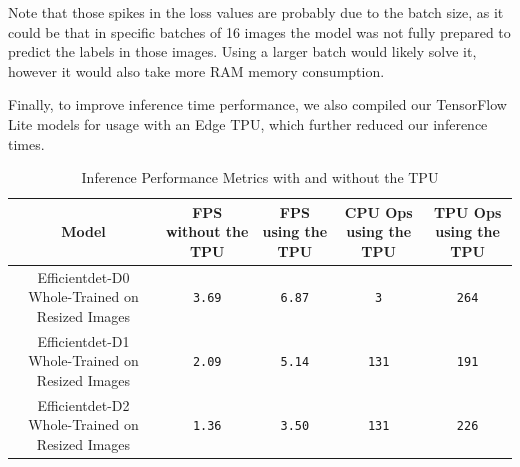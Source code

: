 
Note that those spikes in the loss values are probably due to the batch size, as it could be 
that in specific batches of 16 images the model was not fully prepared to predict the labels
in those images. Using a larger batch would likely solve it, however it would also take more RAM
memory consumption. 

Finally, to improve inference time performance, we also compiled our TensorFlow Lite models for 
usage with an Edge TPU, which further reduced our inference times. 

\begin{table}[H]
	\centering
	\caption[Inference Performance Metrics with and without the TPU]{Inference Performance Metrics with and without the TPU}
	\begin{adjustbox}{width=1\textwidth}
	\label{tab:modelPerformance}
	\begin{tabular}{c|c|c|c|c}
		\hline 
		Model & FPS without the TPU & FPS using the TPU & CPU Ops using the TPU & TPU Ops using the TPU\\
		\hline
        Efficientdet-D0 Whole-Trained on Resized Images & \texttt{3.69} & \texttt{6.87} & \texttt{3} & \texttt{264}\\
		Efficientdet-D1 Whole-Trained on Resized Images & \texttt{2.09} & \texttt{5.14} & \texttt{131} & \texttt{191}\\
		Efficientdet-D2 Whole-Trained on Resized Images & \texttt{1.36} & \texttt{3.50} & \texttt{131} & \texttt{226}\\ 
		\hline 
	\end{tabular}
	\end{adjustbox}
\end{table}

